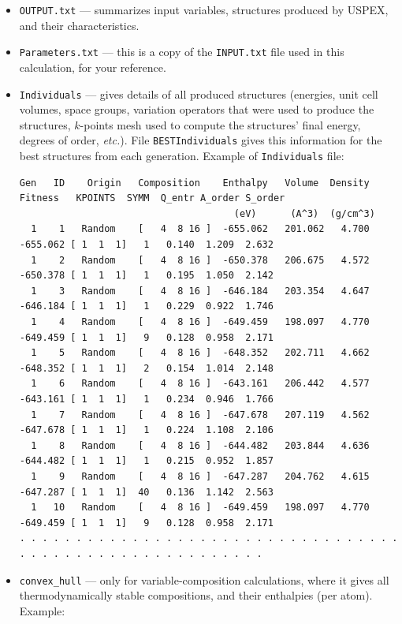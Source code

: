 \documentclass[12pt]{article}
\newcommand{\file}[1]{\texttt{#1}}
\begin{document}
\begin{itemize}

\item \file{OUTPUT.txt} --- summarizes input variables, structures produced by
USPEX, and their characteristics.

\item \file{Parameters.txt} --- this is a copy of the \file{INPUT.txt} file
used in this calculation, for your reference.

\item \file{Individuals} --- gives details of all produced structures
(energies, unit cell volumes, space groups, variation operators that were used
to produce the structures, $k$-points mesh used to compute the structures' final
energy, degrees of order, \emph{etc.}). File \file{BESTIndividuals} gives this
information for the best structures from each generation. Example of
\file{Individuals} file:

{\tiny
\begin{verbatim}
Gen   ID    Origin   Composition    Enthalpy   Volume  Density   Fitness   KPOINTS  SYMM  Q_entr A_order S_order
                                      (eV)      (A^3)  (g/cm^3)
  1    1   Random    [   4  8 16 ]  -655.062   201.062   4.700   -655.062 [ 1  1  1]   1   0.140  1.209  2.632
  1    2   Random    [   4  8 16 ]  -650.378   206.675   4.572   -650.378 [ 1  1  1]   1   0.195  1.050  2.142
  1    3   Random    [   4  8 16 ]  -646.184   203.354   4.647   -646.184 [ 1  1  1]   1   0.229  0.922  1.746
  1    4   Random    [   4  8 16 ]  -649.459   198.097   4.770   -649.459 [ 1  1  1]   9   0.128  0.958  2.171
  1    5   Random    [   4  8 16 ]  -648.352   202.711   4.662   -648.352 [ 1  1  1]   2   0.154  1.014  2.148
  1    6   Random    [   4  8 16 ]  -643.161   206.442   4.577   -643.161 [ 1  1  1]   1   0.234  0.946  1.766
  1    7   Random    [   4  8 16 ]  -647.678   207.119   4.562   -647.678 [ 1  1  1]   1   0.224  1.108  2.106
  1    8   Random    [   4  8 16 ]  -644.482   203.844   4.636   -644.482 [ 1  1  1]   1   0.215  0.952  1.857
  1    9   Random    [   4  8 16 ]  -647.287   204.762   4.615   -647.287 [ 1  1  1]  40   0.136  1.142  2.563
  1   10   Random    [   4  8 16 ]  -649.459   198.097   4.770   -649.459 [ 1  1  1]   9   0.128  0.958  2.171
. . . . . . . . . . . . . . . . . . . . . . . . . . . . . . . . . . . . . . . . . . . . . . . . . . . . . . . .
\end{verbatim}
}

\item \file{convex\_hull} --- only for variable-composition calculations, where
it gives all thermodynamically stable compositions, and their enthalpies (per
atom). Example:


\end{itemize}
\end{document}
